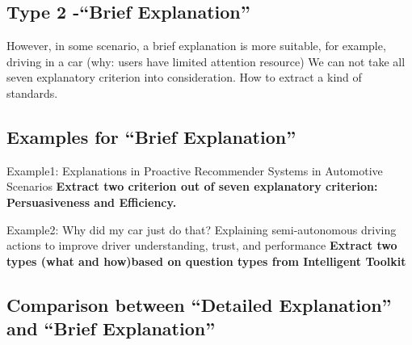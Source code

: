\subsection{Type 2 -``Brief Explanation''}
    However, in some scenario, a brief explanation is more suitable, for example, driving in a car
    (why: users have limited attention resource)
    We can not take all seven explanatory criterion into consideration.
    How to extract a kind of standards.
\subsection{Examples for ``Brief Explanation''}
    Example1: Explanations in Proactive Recommender Systems in Automotive Scenarios \cite{bader122011explanations}
    \textbf{Extract two criterion out of seven explanatory criterion: Persuasiveness and Efficiency.}

    Example2: Why did my car just do that? Explaining semi-autonomous driving actions to improve driver understanding, trust, and performance\cite{koo2015did}
    \textbf{Extract two types (what and how)based on question types from Intelligent Toolkit} \cite{lim2010toolkit, lim2011design}
\subsection{Comparison between ``Detailed Explanation'' and ``Brief Explanation''}
